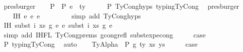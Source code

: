 \begin{isabellebody}
\ presburger\isanewline
\ \ \isamarkupfalse%
\ P{}{\isacharcolon}{\kern0pt}\ {\isachardoublequoteopen}{\isasymGamma}{\isacharprime}{\kern0pt}\ {\isasymturnstile}{\isacharbraceleft}{\kern0pt}P{\isacharbraceright}{\kern0pt}\ e{}{\isacharprime}{\kern0pt}\ {\isacharcolon}{\kern0pt}\ ty{\isacharprime}{\kern0pt}{\isachardoublequoteclose}\isanewline
\ \ \ \ \isamarkupfalse%
\ P{}\ TyCong{\isachardot}{\kern0pt}hyps{\isacharparenleft}{\kern0pt}{}{\isacharparenright}{\kern0pt}\ typing{\isachardot}{\kern0pt}TyCong\ \isamarkupfalse%
\ presburger\isanewline
\isanewline
\isanewline
\ \ \isamarkupfalse%
\ IH{\isacharcolon}{\kern0pt}\ {\isachardoublequoteopen}e{}{\isacharprime}{\kern0pt}\ {\isasymsimeq}e\ e{}{\isacharprime}{\kern0pt}{\isachardoublequoteclose}\isanewline
\ \ \ \ \ \ \ \isamarkupfalse%
\ {\isacharparenleft}{\kern0pt}simp\ add{\isacharcolon}{\kern0pt}\ TyCong{\isachardot}{\kern0pt}hyps{\isacharparenleft}{\kern0pt}{}{\isacharparenright}{\kern0pt}{\isacharparenright}{\kern0pt}\isanewline
\isanewline
\ \ \isamarkupfalse%
\ \isamarkupfalse%
\ IH{}{\isacharcolon}{\kern0pt}\ {\isachardoublequoteopen}subst\ i\ xs\ g{}\ e{}{\isacharprime}{\kern0pt}\ {\isasymsimeq}e\ subst\ i\ xs\ g{}\ e{}{\isacharprime}{\kern0pt}{\isachardoublequoteclose}\isanewline
\ \ \ \ \ \isamarkupfalse%
\ {\isacharparenleft}{\kern0pt}simp\ add{\isacharcolon}{\kern0pt}\ IHFL{}\ TyCong{\isachardot}{\kern0pt}prems{\isacharparenleft}{\kern0pt}{}{\isacharparenright}{\kern0pt}\ gcong{\isachardot}{\kern0pt}refl\ subst{\isacharunderscore}{\kern0pt}exp{\isacharunderscore}{\kern0pt}econg{}{\isacharparenright}{\kern0pt}\isanewline
\ \ \isamarkupfalse%
\ \isamarkupfalse%
\ {\isacharquery}{\kern0pt}case\isanewline
\ \ \ \ \isamarkupfalse%
\ P{}\ typing{\isachardot}{\kern0pt}TyCong\ \isamarkupfalse%
\ auto\isanewline
{}\isamarkupfalse%
\isanewline
\ \ \isamarkupfalse%
\ {\isacharparenleft}{\kern0pt}TyAlpha\ {\isasymGamma}{}\ P\ g\ ty\ xs\ ys{\isacharparenright}{\kern0pt}\isanewline
\ \ \isamarkupfalse%
\ \isamarkupfalse%
\ {\isacharquery}{\kern0pt}case\isanewline
\ \ \ \isamarkupfalse%

\end{isabellebody}
